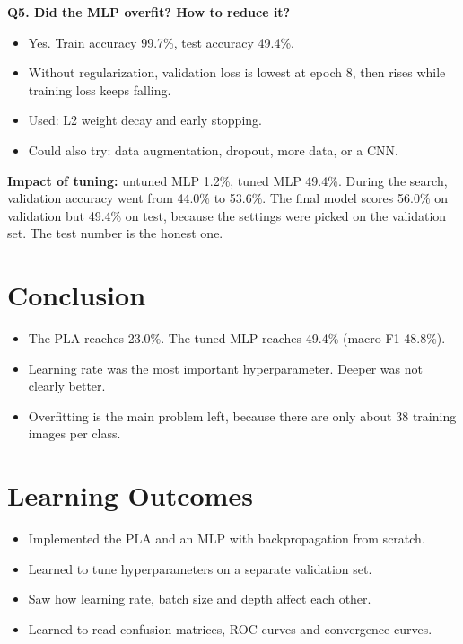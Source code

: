 \documentclass[12pt,a4paper]{article}
\begin{document}
\textbf{Q5. Did the MLP overfit? How to reduce it?}
\begin{itemize}
\item Yes. Train accuracy 99.7\%, test accuracy 49.4\%.
\item Without regularization, validation loss is lowest at epoch 8, then rises while training loss keeps falling.
\item Used: L2 weight decay and early stopping.
\item Could also try: data augmentation, dropout, more data, or a CNN.
\end{itemize}

\textbf{Impact of tuning:} untuned MLP 1.2\%, tuned MLP 49.4\%. During the search, validation accuracy went from
44.0\% to 53.6\%. The final model scores 56.0\% on validation but 49.4\% on test, because the settings were
picked on the validation set. The test number is the honest one.

\section{Conclusion}
\begin{itemize}
\item The PLA reaches 23.0\%. The tuned MLP reaches 49.4\% (macro F1 48.8\%).
\item Learning rate was the most important hyperparameter. Deeper was not clearly better.
\item Overfitting is the main problem left, because there are only about 38 training images per class.
\end{itemize}

\section{Learning Outcomes}
\begin{itemize}
\item Implemented the PLA and an MLP with backpropagation from scratch.
\item Learned to tune hyperparameters on a separate validation set.
\item Saw how learning rate, batch size and depth affect each other.
\item Learned to read confusion matrices, ROC curves and convergence curves.
\end{itemize}
\end{document}
